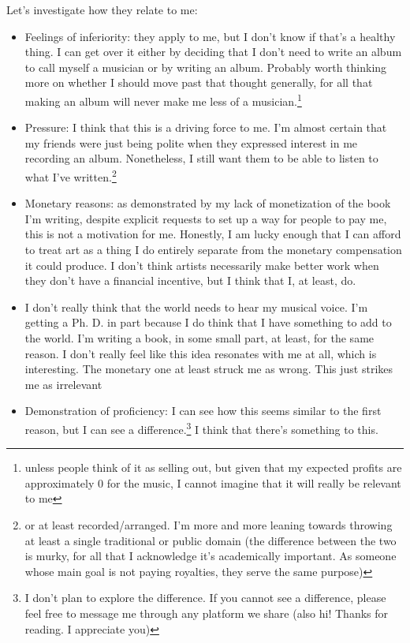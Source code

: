 \documentclass[12pt]{article}[titlepage]
\newcommand{\1}{\={a}}
\newcommand{\2}{\={e}}
\newcommand{\3}{\={\i}}
\newcommand{\4}{\=o}
\newcommand{\5}{\=u}
\newcommand{\6}{\={A}}
\renewcommand{\,}{\textsuperscript{,}}
\begin{document}
Let's investigate how they relate to me:
\begin{itemize}
\item Feelings of inferiority: they apply to me, but I don't know if that's a healthy thing. I can get over it either by deciding that I don't need to write an album to call myself a musician or by writing an album. Probably worth thinking more on whether I should move past that thought generally, for all that making an album will never make me less of a musician.\footnote{unless people think of it as selling out, but given that my expected profits are approximately 0 for the music, I cannot imagine that it will really be relevant to me}
\item Pressure: I think that this is a driving force to me. I'm almost certain that my friends were just being polite when they expressed interest in me recording an album.
Nonetheless, I still want them to be able to listen to what I've written.\footnote{or at least recorded/arranged. I'm more and more leaning towards throwing at least a single traditional or public domain (the difference between the two is murky, for all that I acknowledge it's academically important. As someone whose main goal is not paying royalties, they serve the same purpose)}
\item Monetary reasons: as demonstrated by my lack of monetization of the book I'm writing, despite explicit requests to set up a way for people to pay me, this is not a motivation for me.
Honestly, I am lucky enough that I can afford to treat art as a thing I do entirely separate from the monetary compensation it could produce.
I don't think artists necessarily make better work when they don't have a financial incentive, but I think that I, at least, do.
\item I don't really think that the world needs to hear my musical voice.
I'm getting a Ph. D. in part because I do think that I have something to add to the world.
I'm writing a book, in some small part, at least, for the same reason.
I don't really feel like this idea resonates with me at all, which is interesting.
The monetary one at least struck me as wrong.
This just strikes me as irrelevant
\item Demonstration of proficiency: I can see how this seems similar to the first reason, but I can see a difference.\footnote{I don't plan to explore the difference. If you cannot see a difference, please feel free to message me through any platform we share (also hi! Thanks for reading. I appreciate you)}
I think that there's something to this.

\end{itemize}
\end{document}
